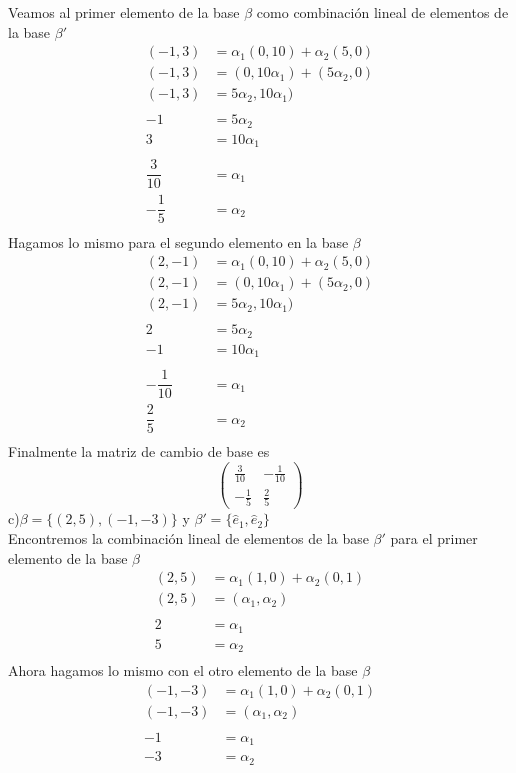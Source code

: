 \documentclass[letterpaper]{article}
\renewcommand{\*}{\cdot}
\theoremstyle{definition}
\begin{document}
	Veamos al primer elemento de la base $ \beta$ como combinación lineal de elementos de la base $ \beta' $ 
	\begin{align*}
		(-1,3) & = \alpha_1(0,10) + \alpha_2(5,0)\\
		(-1,3) & = (0,10\alpha_1) + (5\alpha_2,0)\\
		(-1,3) & = 5\alpha_2,10\alpha_1)\\
		\\
		-1 &= 5\alpha_2\\
		3 &= 10\alpha_1\\
		\\
		\dfrac{3}{10} &=\alpha_1\\
		-\dfrac{1}{5} &=\alpha_2\\
	\end{align*}
	Hagamos lo mismo para el segundo elemento en la base $ \beta $
	\begin{align*}
	(2,-1) & = \alpha_1(0,10) + \alpha_2(5,0)\\
	(2,-1) & = (0,10\alpha_1) + (5\alpha_2,0)\\
	(2,-1) & = 5\alpha_2,10\alpha_1)\\
	\\
	2 &= 5\alpha_2\\
	-1 &= 10\alpha_1\\
	\\
	-\dfrac{1}{10} &=\alpha_1\\
	\dfrac{2}{5} &=\alpha_2\\
	\end{align*}
	Finalmente la matriz de cambio de base es 
	\[ \begin{pmatrix}
		\frac{3}{10} & -\frac{1}{10}\\
		-\frac{1}{5} & \frac{2}{5}
	\end{pmatrix}\]
	c)$\beta = \lbrace (2,5),(-1,-3) \rbrace$ y $\beta' = \lbrace \hat{e}_{1},\hat{e}_{2} \rbrace$\\
	Encontremos la combinación lineal de elementos de la base $ \beta' $ para el primer elemento de la base $ \beta $	
	\begin{align*}
		(2,5) &= \alpha_1(1,0) + \alpha_2(0,1)\\
		(2,5) &= (\alpha_1, \alpha_2)\\
		\\
		2 &= \alpha_1\\
		5 &= \alpha_2\\
	\end{align*}
	Ahora hagamos lo mismo con el otro elemento de la base $ \beta $
	\begin{align*}
	(-1,-3) &= \alpha_1(1,0) + \alpha_2(0,1)\\
	(-1,-3) &= (\alpha_1, \alpha_2)\\
	\\
	-1 &= \alpha_1\\
	-3 &= \alpha_2\\
	\end{align*}
\end{document}
